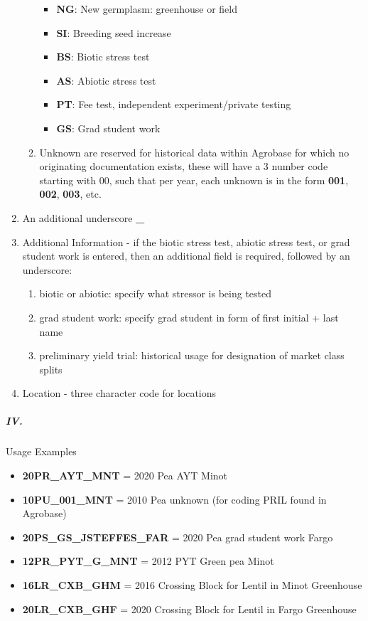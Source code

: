 \documentclass[12pt, letterpaper,oneocolumn]{article}
\begin{document}
\begin{appendices}
\begin{enumerate}
\begin{enumerate}
    \begin{itemize}
    \item
      \textbf{NG}: New germplasm: greenhouse or field
    \item
      \textbf{SI}: Breeding seed increase
    \item
      \textbf{BS}: Biotic stress test
    \item
      \textbf{AS}: Abiotic stress test
    \item
      \textbf{PT}: Fee test, independent experiment/private testing
    \item
      \textbf{GS}: Grad student work
    \end{itemize}
  \item
    Unknown are reserved for historical data within Agrobase for which
    no originating documentation exists, these will have a 3 number code
    starting with 00, such that per year, each unknown is in the form
    \textbf{001}, \textbf{002}, \textbf{003}, etc.
  \end{enumerate}
\item
  An additional underscore \textbf{\_}
\item
  Additional Information - if the biotic stress test, abiotic stress
  test, or grad student work is entered, then an additional field is
  required, followed by an underscore:

  \begin{enumerate}
  \item
    biotic or abiotic: specify what stressor is being tested
  \item
    grad student work: specify grad student in form of first initial +
    last name
  \item
    preliminary yield trial: historical usage for designation of market
    class splits
  \end{enumerate}
\item
  Location - three character code for locations
\end{enumerate}

\subparagraph{IV.} Usage Examples

\begin{itemize}
\item
  \textbf{20PR\_AYT\_MNT} = 2020 Pea AYT Minot
\item
  \textbf{10PU\_001\_MNT} = 2010 Pea unknown (for coding PRIL found in
  Agrobase)
\item
  \textbf{20PS\_GS\_JSTEFFES\_FAR} = 2020 Pea grad student work Fargo
\item
  \textbf{12PR\_PYT\_G\_MNT} = 2012 PYT Green pea Minot
\item
  \textbf{16LR\_CXB\_GHM} = 2016 Crossing Block for Lentil in Minot
  Greenhouse
\item
  \textbf{20LR\_CXB\_GHF} = 2020 Crossing Block for Lentil in Fargo
  Greenhouse
\end{itemize}


\end{appendices}
\end{document}
